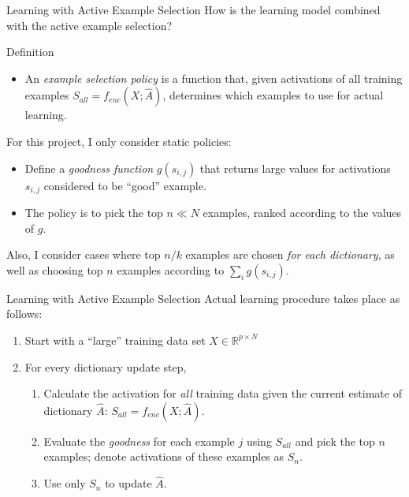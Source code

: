 \documentclass{beamer}
\newcommand{\R}{\mathbb{R}}
\begin{document}
\begin{frame}{Learning with Active Example Selection}
How is the learning model combined with the active example selection?

\begin{beamerboxesrounded}[lower=lowyellow,upper=upyellow,shadow=true]{Definition}
\begin{itemize}
	\item An \emph{example selection policy} is a function that, given activations of all training examples $S_{all} = f_{enc}(X ; {\hat A})$, determines which examples to use for actual learning.
\end{itemize}
\end{beamerboxesrounded}

For this project, I only consider static policies: 

\begin{itemize}
	\item Define a \emph{goodness function} $g(s_{i, j})$ that returns large values for activations $s_{i, j}$ considered to be ``good'' example.
	\item The policy is to pick the top $n \ll N$ examples, ranked according to the values of $g$.
\end{itemize}

Also, I consider cases where top $n / k$ examples are chosen \emph{for each dictionary}, as well as choosing top $n$ examples according to $\sum_i g(s_{i,j})$.
\end{frame}

\begin{frame}{Learning with Active Example Selection}
Actual learning procedure takes place as follows:

\begin{enumerate}
	\item Start with a ``large'' training data set $X \in \R^{p \times N}$
	\item For every dictionary update step, 

\begin{enumerate}
	\item Calculate the activation for \emph{all} training data given the current estimate of dictionary ${\hat A}$: $S_{all} = f_{enc}(X ; {\hat A})$.

	\item Evaluate the \emph{goodness} for each example $j$ using $S_{all}$ and pick the top $n$ examples; denote activations of these examples as $S_n$.

	\item Use only $S_n$ to update ${\hat A}$.

\end{enumerate}

\end{enumerate}
\end{frame}
\end{document}
